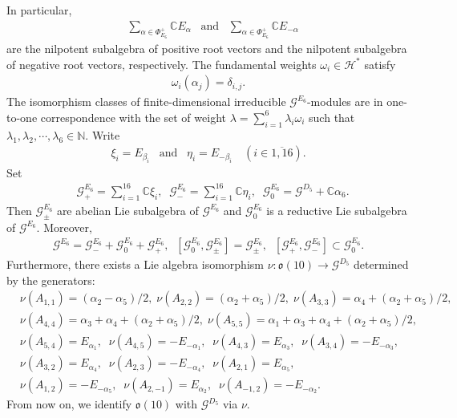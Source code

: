 \documentclass[12pt]{article}
\numberwithin{equation}{section}
\theoremstyle{definition}
\theoremstyle{remark}
\begin{document}
In particular,
\begin{eqnarray}
	&\sum\limits_{\alpha\in\Phi_{E_6}^+}\mathbb{C}E_{\alpha}\;\;\;\text{and}\;\;\;\sum\limits_{\alpha\in\Phi_{E_6}^+}\mathbb{C}E_{-\alpha}
\end{eqnarray}
are the nilpotent subalgebra of positive root vectors and the nilpotent subalgebra of negative root vectors, respectively. The fundamental weights $\omega_i\in \mathscr{H}^*$ satisfy
\begin{eqnarray}
	\omega_i(\alpha_j)=\delta_{i,j}.
\end{eqnarray}
The isomorphism classes of finite-dimensional irreducible $\mathscr{G}^{E_6}$-modules are in one-to-one correspondence with the set of weight $\lambda=\sum_{i=1}^6\lambda_i\omega_i$ such that $\lambda_1,\lambda_2,\cdots,\lambda_6\in\mathbb{N}$. 
Write
\begin{eqnarray}
	\xi_i=E_{\beta_i} \;\;\;\text{and}\;\;\;\eta_i=E_{-\beta_i}\quad (i\in\overline{1,16}).  \label{2.43}
\end{eqnarray}
Set
\begin{eqnarray}
	&\mathscr{G}^{E_{6}}_+=\sum\limits_{i=1}^{16}\mathbb{C}\xi_i,\;\;\mathscr{G}^{E_{6}}_-=\sum\limits_{i=1}^{16}\mathbb{C}\eta_i,\;\;\mathscr{G}^{E_6}_0=\mathscr{G}^{D_5}+\mathbb{C}\alpha_6. \label{2.44}
\end{eqnarray}
Then $\mathscr{G}^{E_6}_{\pm}$ are abelian Lie subalgebra of $\mathscr{G}^{E_{6}}$ and $\mathscr{G}^{E_6}_0$ is a reductive Lie subalgebra of $\mathscr{G}^{E_{6}}$. Moreover,
\begin{eqnarray}
	\mathscr{G}^{E_6}=\mathscr{G}^{E_6}_-+\mathscr{G}^{E_6}_0+\mathscr{G}^{E_6}_+,\;\;[\mathscr{G}^{E_6}_0,\mathscr{G}^{E_6}_{\pm}]=\mathscr{G}^{E_6}_{\pm},\;\;[\mathscr{G}^{E_6}_+,\mathscr{G}^{E_6}_-]\subset\mathscr{G}^{E_6}_0. \label{2.41}
\end{eqnarray}
Furthermore, there exists a Lie algebra isomorphism $\nu:\mathfrak{o}(10)\longrightarrow \mathscr{G}^{D_5}$ determined by the generators:
\begin{eqnarray}
	&\nu(A_{1,1})=(\alpha_2-\alpha_5)/2,\;\nu(A_{2,2})=(\alpha_2+\alpha_5)/2,\;\nu(A_{3,3})=\alpha_4+(\alpha_2+\alpha_5)/2,\label{2.46}\\
	&\nu(A_{4,4})=\alpha_3+\alpha_4+(\alpha_2+\alpha_5)/2,\;\nu(A_{5,5})=\alpha_1+\alpha_3+\alpha_4+(\alpha_2+\alpha_5)/2,\label{2.47}\\
	&\nu(A_{5,4})=E_{\alpha_1},\;\;\nu(A_{4,5})=-E_{-\alpha_1},\;\;\nu(A_{4,3})=E_{\alpha_3},\;\;\nu(A_{3,4})=-E_{-\alpha_3},\label{2.48}\\
	&\nu(A_{3,2})=E_{\alpha_4},\;\;\nu(A_{2,3})=-E_{-\alpha_4},\;\;\nu(A_{2,1})=E_{\alpha_5},\label{2.49}\\
	&\nu(A_{1,2})=-E_{-\alpha_5},\;\;\nu(A_{2,-1})=E_{\alpha_2},\;\;\nu(A_{-1,2})=-E_{-\alpha_{2}}.\label{2.50}
\end{eqnarray}
From now on, we identify $\mathfrak{o}(10)$ with $\mathscr{G}^{D_5}$ via $\nu$.
\end{document}
